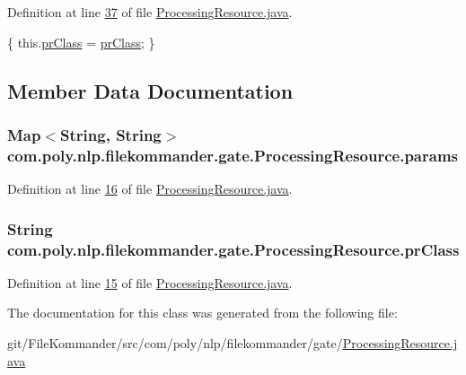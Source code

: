 Definition at line \hyperlink{L37}{37} of file \hyperlink{}{Processing\-Resource.\-java}.


\begin{DoxyCode}
                                           \{
        this.\hyperlink{classcom_1_1poly_1_1nlp_1_1filekommander_1_1gate_1_1_processing_resource_a018942d9b39afb00b7d92e874246f191}{prClass} = \hyperlink{classcom_1_1poly_1_1nlp_1_1filekommander_1_1gate_1_1_processing_resource_a018942d9b39afb00b7d92e874246f191}{prClass};
    \}
\end{DoxyCode}


\subsection{Member Data Documentation}
\hypertarget{classcom_1_1poly_1_1nlp_1_1filekommander_1_1gate_1_1_processing_resource_a9d38f54ab731c5b496b0583bd8dcce9b}{
\subsubsection[{params}]{\setlength{\rightskip}{0pt plus 5cm}Map$<$String, String$>$ com.\-poly.\-nlp.\-filekommander.\-gate.\-Processing\-Resource.\-params}}\label{classcom_1_1poly_1_1nlp_1_1filekommander_1_1gate_1_1_processing_resource_a9d38f54ab731c5b496b0583bd8dcce9b}


Definition at line \hyperlink{L16}{16} of file \hyperlink{}{Processing\-Resource.\-java}.

\hypertarget{classcom_1_1poly_1_1nlp_1_1filekommander_1_1gate_1_1_processing_resource_a018942d9b39afb00b7d92e874246f191}{
\subsubsection[{pr\-Class}]{\setlength{\rightskip}{0pt plus 5cm}String com.\-poly.\-nlp.\-filekommander.\-gate.\-Processing\-Resource.\-pr\-Class}}\label{classcom_1_1poly_1_1nlp_1_1filekommander_1_1gate_1_1_processing_resource_a018942d9b39afb00b7d92e874246f191}


Definition at line \hyperlink{L15}{15} of file \hyperlink{}{Processing\-Resource.\-java}.



The documentation for this class was generated from the following file\-:\begin{DoxyCompactItemize}
\item 
git/\-File\-Kommander/src/com/poly/nlp/filekommander/gate/\hyperlink{_processing_resource_8java}{Processing\-Resource.\-java}\end{DoxyCompactItemize}
